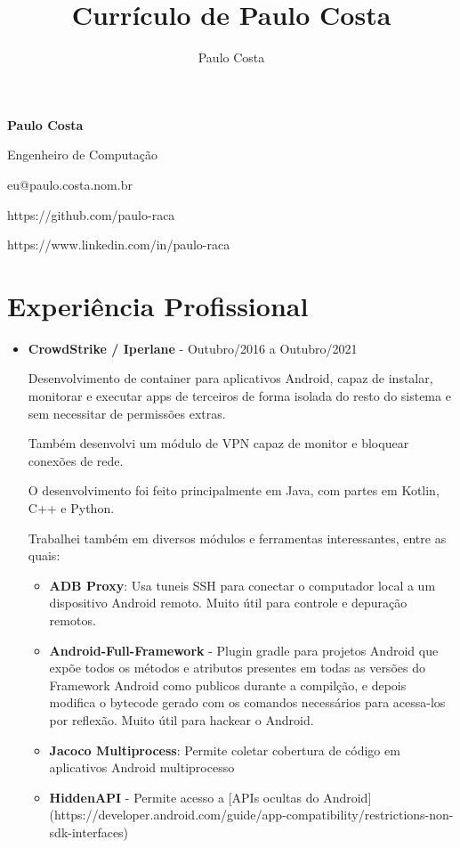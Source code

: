 \documentclass[a4paper,10pt]{article}
\title{Currículo de Paulo Costa}
\author{Paulo Costa}
\begin{document}
  
  \LARGE\textbf{Paulo Costa}

  \large Engenheiro de Computação

  \large eu@paulo.costa.nom.br

  \large https://github.com/paulo-raca

  \large https://www.linkedin.com/in/paulo-raca



  \normalsize 

  \section{Experiência Profissional}
    \begin{itemize}
      \item
        \textbf{CrowdStrike / Iperlane} - Outubro/2016 a Outubro/2021

        Desenvolvimento de container para aplicativos Android, capaz de instalar, monitorar e executar
        apps de terceiros de forma isolada do resto do sistema e sem necessitar de permissões extras.

        Também desenvolvi um módulo de VPN capaz de monitor e bloquear conexões de rede.

        O desenvolvimento foi feito principalmente em Java, com partes em Kotlin, C++ e Python.

        Trabalhei também em diversos módulos e ferramentas interessantes, entre as quais:

        \begin{itemize}
          \item \textbf{ADB Proxy}: Usa tuneis SSH para conectar o computador local a um dispositivo Android remoto. Muito útil para controle e depuração remotos.
          \item \textbf{Android-Full-Framework} - Plugin gradle para projetos Android que expõe todos os métodos e atributos presentes em todas as versões do Framework Android como publicos durante a compilção, e depois modifica o bytecode gerado com os comandos necessários para acessa-los por reflexão. Muito útil para hackear o Android.
          \item \textbf{Jacoco Multiprocess}: Permite coletar cobertura de código em aplicativos Android multiprocesso
          \item \textbf{HiddenAPI} - Permite acesso a [APIs ocultas do Android](https://developer.android.com/guide/app-compatibility/restrictions-non-sdk-interfaces)
        \end{itemize}


\end{itemize}
\end{document}
